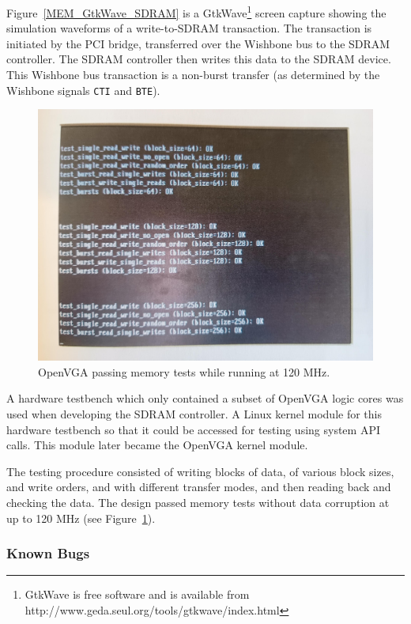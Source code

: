 Figure~\ref{MEM_GtkWave_SDRAM} is a GtkWave\footnote{GtkWave is free software and
is available from http://www.geda.seul.org/tools/gtkwave/index.html} screen
capture showing the simulation waveforms of a write-to-SDRAM transaction. The
transaction is initiated by the PCI bridge, transferred over the Wishbone bus to
the SDRAM controller. The SDRAM controller then writes this data to the SDRAM
device. This Wishbone bus transaction is a non-burst transfer (as determined by
the Wishbone signals \texttt{CTI} and \texttt{BTE}).

\begin{figure}[h!]
\begin{center}
\includegraphics[width=\linewidth]{images/mem_test.jpeg}
\caption[SDRAM Memory Test Results]{OpenVGA passing memory tests
while running at 120 MHz.}
\label{MEM_Testing}
\end{center}
\end{figure}

A hardware testbench which only contained a subset of OpenVGA logic cores was
used when developing the SDRAM controller. A Linux kernel module for this
hardware testbench so that it could be accessed for testing using system API
calls. This module later became the OpenVGA kernel module.

The testing procedure consisted of writing blocks of data, of various block
sizes, and write orders, and with different transfer modes, and then reading back
and checking the data. The design passed memory tests without data corruption at
up to 120 MHz (see Figure~\ref{MEM_Testing}).


\subsubsection{Known Bugs}
\label{SDRAM_Bug}

